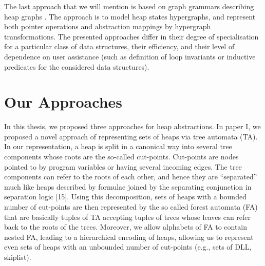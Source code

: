 The last approach that we will mention is based on graph grammars describing heap graphs \cite{Jonathan:Shape, Jonathan:Grammars}.  The approach is to model heap states hypergraphs, and represent both pointer operations and abstraction mappings by hypergraph transformations. The presented approaches differ in their degree of specialisation for a particular class of data structures, their efficiency, and their level of dependence on user assistance (such as definition of loop invariants or inductive predicates for the considered data structures).
  
\section*{Our Approaches}
In this thesis, we proposed three approaches for heap abstractions. In paper I, we proposed a novel approach of representing sets of heaps via tree automata (TA). In our representation, a heap is split in a canonical way into several tree components whose roots are the so-called cut-points. Cut-points are nodes pointed to by program variables or having several incoming edges. The tree components can refer to the roots of each other, and hence they are “separated” much like heaps described by formulae joined by the separating conjunction in separation logic [15]. Using this decomposition, sets of heaps with a bounded number of cut-points are then represented by the so called forest automata (FA) that are basically tuples of TA accepting tuples of trees whose leaves can refer back to the roots of the trees. Moreover, we allow alphabets of FA to contain nested FA, leading to a hierarchical encoding of heaps, allowing us to represent even sets of heaps with an unbounded number of cut-points (e.g., sets of DLL, skiplist). 
